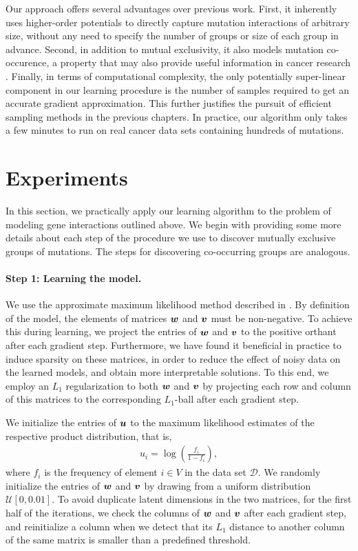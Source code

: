 Our approach offers several advantages over previous work.
First, it inherently uses higher-order potentials to directly capture mutation interactions of arbitrary size, without any need to specify the number of groups or size of each group in advance.
Second, in addition to mutual exclusivity, it also models mutation co-occurence, a property that may also provide useful information in cancer research \citep{yeang08,raphael14}.
Finally, in terms of computational complexity, the only potentially super-linear component in our learning procedure is the number of samples required to get an accurate gradient approximation.
This further justifies the pursuit of efficient sampling methods in the previous chapters.
In practice, our algorithm only takes a few minutes to run on real cancer data sets containing hundreds of mutations.


\section{Experiments}
In this section, we practically apply our learning algorithm to the problem of modeling gene interactions outlined above.
We begin with providing some more details about each step of the procedure we use to discover mutually exclusive groups of mutations.
The steps for discovering co-occurring groups are analogous.

\paragraph{Step 1: Learning the \fldc{} model.}
We use the approximate maximum likelihood method described in .
By definition of the \fldc{} model, the elements of matrices $\bm{w}$ and $\bm{v}$ must be non-negative.
To achieve this during learning, we project the entries of $\bm{w}$ and $\bm{v}$ to the positive orthant after each gradient step.
Furthermore, we have found it beneficial in practice to induce sparsity on these matrices, in order to reduce the effect of noisy data on the learned models, and obtain more interpretable solutions.
To this end, we employ an $L_1$ regularization to both $\bm{w}$ and $\bm{v}$ by projecting each row and column of this matrices to the corresponding $L_1$-ball after each gradient step.

We initialize the entries of $\bm{u}$ to the maximum likelihood estimates of the respective product distribution, that is,
\begin{align*}
u_i = \log\left( \frac{f_i}{1 - f_i} \right),
\end{align*}
where $f_i$ is the frequency of element $i \in V$ in the data set $\mathcal{D}$.
We randomly initialize the entries of $\bm{w}$ and $\bm{v}$ by drawing from a uniform distribution $\mathcal{U}[0, 0.01]$.
To avoid duplicate latent dimensions in the two matrices, for the first half of the iterations, we check the columns of $\bm{w}$ and $\bm{v}$ after each gradient step, and reinitialize a column when we detect that its $L_1$ distance to another column of the same matrix is smaller than a predefined threshold.

